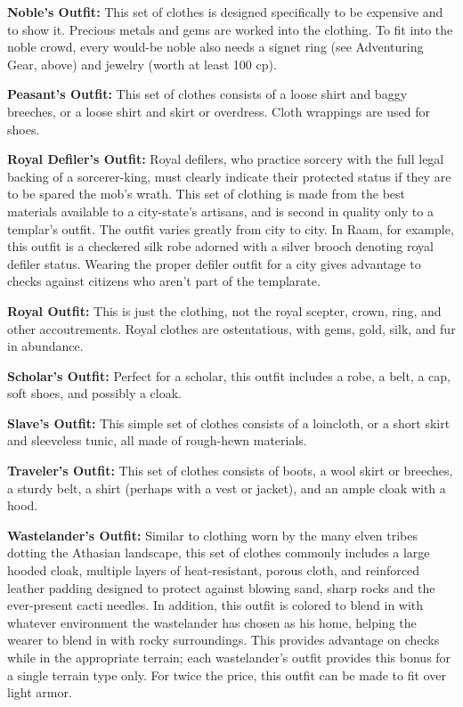 
\textbf{Noble's Outfit:} This set of clothes is designed specifically to be expensive and to show it. Precious metals and gems are worked into the clothing. To fit into the noble crowd, every would-be noble also needs a signet ring (see Adventuring Gear, above) and jewelry (worth at least 100 cp).

\textbf{Peasant's Outfit:} This set of clothes consists of a loose shirt and baggy breeches, or a loose shirt and skirt or overdress. Cloth wrappings are used for shoes.

\textbf{Royal Defiler's Outfit:} Royal defilers, who practice sorcery with the full legal backing of a sorcerer-king, must clearly indicate their protected status if they are to be spared the mob's wrath. This set of clothing is made from the best materials available to a city-state's artisans, and is second in quality only to a templar's outfit. The outfit varies greatly from city to city. In Raam, for example, this outfit is a checkered silk robe adorned with a silver brooch denoting royal defiler status. Wearing the proper defiler outfit for a city gives advantage to  checks against citizens who aren't part of the templarate.

\textbf{Royal Outfit:} This is just the clothing, not the royal scepter, crown, ring, and other accoutrements. Royal clothes are ostentatious, with gems, gold, silk, and fur in abundance.

\textbf{Scholar's Outfit:} Perfect for a scholar, this outfit includes a robe, a belt, a cap, soft shoes, and possibly a cloak.

\textbf{Slave's Outfit:} This simple set of clothes consists of a loincloth, or a short skirt and sleeveless tunic, all made of rough-hewn materials.

\textbf{Traveler's Outfit:} This set of clothes consists of boots, a wool skirt or breeches, a sturdy belt, a shirt (perhaps with a vest or jacket), and an ample cloak with a hood.

\textbf{Wastelander's Outfit:} Similar to clothing worn by the many elven tribes dotting the Athasian landscape, this set of clothes commonly includes a large hooded cloak, multiple layers of heat-resistant, porous cloth, and reinforced leather padding designed to protect against blowing sand, sharp rocks and the ever-present cacti needles. In addition, this outfit is colored to blend in with whatever environment the wastelander has chosen as his home, helping the wearer to blend in with rocky surroundings. This provides advantage on  checks while in the appropriate terrain; each wastelander's outfit provides this bonus for a single terrain type only. For twice the price, this outfit can be made to fit over light armor.